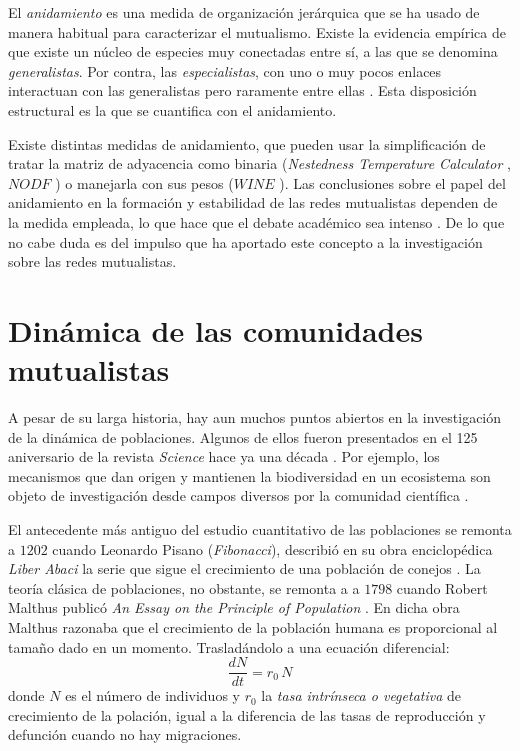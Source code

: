 El \textit{anidamiento} es una medida de organización jerárquica \cite{atmar1986nested} que se ha usado de manera habitual para caracterizar el mutualismo. Existe la evidencia empírica de que existe un núcleo de especies muy conectadas entre sí, a las que se denomina \textit{generalistas}. Por contra, las \textit{especialistas}, con uno o muy pocos enlaces interactuan con las generalistas pero raramente entre ellas \cite{bascompte2003nested, krishna2008neutral}. Esta disposición estructural es la que se cuantifica con el anidamiento.

Existe distintas medidas de anidamiento, que pueden usar la simplificación de tratar la matriz de adyacencia como binaria (\textit{Nestedness Temperature Calculator} \cite{atmar1995nestedness}, $NODF$ \cite{almeida2008consistent}) o manejarla con sus pesos ($WINE$ \cite{galeano2009weighted}). Las conclusiones sobre el papel del anidamiento en la formación y estabilidad de las redes mutualistas dependen de la medida empleada, lo que hace que el debate académico sea intenso \cite{staniczenko2013ghost, strona2015new}. De lo que no cabe duda es del impulso que ha aportado este concepto a la investigación sobre las redes mutualistas.

\section{Dinámica de las comunidades mutualistas}

A pesar de su larga historia, hay aun muchos puntos abiertos en la investigación de la dinámica de poblaciones. Algunos de ellos fueron presentados en el 125 aniversario de la revista {\em Science} hace ya una década  \cite{kennedy2005,pennisi2005,stokstad2005}. Por ejemplo, los mecanismos que dan origen y mantienen la biodiversidad en un ecosistema son objeto de investigación desde campos diversos por la comunidad científica \cite{williams2000,dunne2002biodiversity,olesen2007modularity,allesina2008,bascompte2009,saavedra2009,bastolla2009,fortuna2010nestedness,encinas2012}.  

El antecedente más antiguo del estudio cuantitativo de las poblaciones se remonta a $1202$ cuando Leonardo Pisano (\textit{Fibonacci}), describió en su obra enciclopédica {\em Liber Abaci} la serie que sigue el crecimiento de una población de conejos \cite{sigler2002}. La teoría clásica de poblaciones, no obstante, se remonta a a $1798$ cuando Robert Malthus publicó {\em An Essay on the Principle of Population} \citep{malthus1798}. En dicha obra Malthus razonaba que el crecimiento de la población humana es proporcional al tamaño dado en un momento. Trasladándolo a una ecuación diferencial:
\begin{equation}
\frac{dN}{dt}=r_0\, N 
\label{eq:malthus}
\end{equation}
\noindent donde $N$ es el número de individuos y $r_0$ la {\em tasa intrínseca o vegetativa} de crecimiento de la polación, igual a la diferencia de las tasas de reproducción y defunción cuando no hay migraciones.

